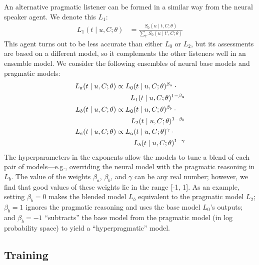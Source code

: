 \documentclass[11pt,letterpaper]{article}
\newcommand{\Listener}{L}
\newcommand{\Speaker}{S}
\newcommand{\utt}{u}
\newcommand{\context}{C}
\newcommand{\target}{t}
\renewcommand{\|}{\mid}
\begin{document}
An alternative pragmatic listener can be formed in a similar way from the neural
speaker agent. We denote this $\Listener_1$:
%
\begin{align}
  \Listener_1(\target \| \utt, \context; \theta)
  &=
    \frac{
    \Speaker_0(\utt \| \target, \context; \theta)
    }{
    \sum_{\target'} \Speaker_0(\utt \| \target', \context; \theta)
    }    \label{eq:l1}
\end{align}
%
This agent turns out to be less accurate than either $\Listener_0$ or
$\Listener_2$, but its assessments are based on a different model,
so it complements the other listeners well in an ensemble model.
We consider the following ensembles of neural base models and pragmatic models:
\begin{align}
\Listener_a(\target \| \utt, \context; \theta) &\propto {\Listener_0}(\target \| \utt, \context; \theta)^{\beta_a} \cdot {} \nonumber \\
& &\mathllap{\Listener_1(\target \| \utt, \context; \theta)^{1-\beta_a}}  \label{eq:beta_a} \\
\Listener_b(\target \| \utt, \context; \theta) &\propto {\Listener_0}(\target \| \utt, \context; \theta)^{\beta_b} \cdot {} \nonumber\\
& &\mathllap{\Listener_2(\target \| \utt, \context; \theta)^{1-\beta_b}}  \label{eq:beta_b} \\
\Listener_e(\target \| \utt, \context; \theta) &\propto {\Listener_a}(\target \| \utt, \context; \theta)^{\gamma} \cdot {} \nonumber\\
& &\mathllap{\Listener_b(\target \| \utt, \context; \theta)^{1-\gamma}}  \label{eq:gamma}
\end{align}
%
The hyperparameters in the exponents allow the models to tune a
blend of each pair of models---e.g., overriding the neural model with the pragmatic
reasoning in $\Listener_b$. The value of the weights
$\beta_a$, $\beta_b$, and $\gamma$ can be any real number; however, we find that
good values of these weights
lie in the range [-1, 1]. As an example, setting $\beta_b = 0$ makes the
blended model $\Listener_b$ equivalent to the pragmatic model $\Listener_2$;
$\beta_b = 1$ ignores the pragmatic reasoning and uses the base model
$\Listener_0$'s outputs; and $\beta_b = -1$
``subtracts'' the base model from the pragmatic model (in log probability space)
to yield a ``hyperpragmatic'' model.

\subsection{Training} \label{sec:training}
\end{document}

